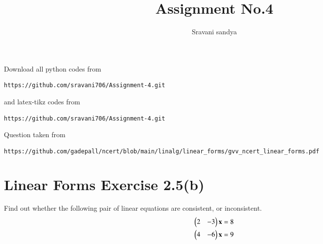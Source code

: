 \documentclass[journal,12pt,twocolumn]{IEEEtran}
\begin{document}
\def\rightbox#1{\makebox[0in][r]{#1}}
\def\centbox#1{\makebox[0in]{#1}}
\def\topbox#1{\raisebox{-\baselineskip}[0in][0in]{#1}}
\def\midbox#1{\raisebox{-0.5\baselineskip}[0in][0in]{#1}}
\vspace{3cm}
\title{Assignment No.4}
\author{Sravani sandya}
\maketitle
\newpage
\bigskip
\renewcommand{\thefigure}{\theenumi}
\renewcommand{\thetable}{\theenumi}
Download all python codes from
\begin{lstlisting}
https://github.com/sravani706/Assignment-4.git
\end{lstlisting}
%
and latex-tikz codes from
%
\begin{lstlisting}
https://github.com/sravani706/Assignment-4.git
\end{lstlisting}
%
Question taken from
\begin{lstlisting}
https://github.com/gadepall/ncert/blob/main/linalg/linear_forms/gvv_ncert_linear_forms.pdf
\end{lstlisting}
\section{Linear Forms Exercise 2.5(b)}
Find out whether the following pair of linear
equations are consistent, or inconsistent.
\begin{align}
    \begin{pmatrix}2&-3\end{pmatrix}\mathbf{x}=8\\
    \begin{pmatrix}4&-6\end{pmatrix}\mathbf{x}=9
\end{align}
\end{document}
